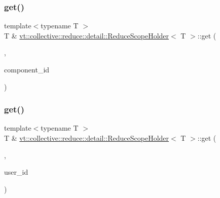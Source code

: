 \subsubsection{\texorpdfstring{get()}{get()}\hspace{0.1cm}{\footnotesize\ttfamily [5/6]}}
{\footnotesize\ttfamily template$<$typename T $>$ \\
T \& \hyperlink{structvt_1_1collective_1_1reduce_1_1detail_1_1_reduce_scope_holder}{vt\+::collective\+::reduce\+::detail\+::\+Reduce\+Scope\+Holder}$<$ T $>$\+::get (\begin{DoxyParamCaption}\item[{\hyperlink{structvt_1_1collective_1_1reduce_1_1detail_1_1_reduce_scope_holder_1_1_component_tag}{Component\+Tag}}]{,  }\item[{\hyperlink{namespacevt_ab6ac935c168b809c422d5121da4f2700}{Component\+I\+D\+Type}}]{component\+\_\+id }\end{DoxyParamCaption})}

\mbox{\label{structvt_1_1collective_1_1reduce_1_1detail_1_1_reduce_scope_holder_a2413b5fd1fbd0b87b09d81240000e5f8}} 
\subsubsection{\texorpdfstring{get()}{get()}\hspace{0.1cm}{\footnotesize\ttfamily [6/6]}}
{\footnotesize\ttfamily template$<$typename T $>$ \\
T \& \hyperlink{structvt_1_1collective_1_1reduce_1_1detail_1_1_reduce_scope_holder}{vt\+::collective\+::reduce\+::detail\+::\+Reduce\+Scope\+Holder}$<$ T $>$\+::get (\begin{DoxyParamCaption}\item[{\hyperlink{structvt_1_1collective_1_1reduce_1_1detail_1_1_reduce_scope_holder_1_1_user_i_d_tag}{User\+I\+D\+Tag}}]{,  }\item[{\hyperlink{namespacevt_1_1collective_1_1reduce_1_1detail_ae82d7b96b0885b9b7dfb0104398beead}{User\+I\+D\+Type}}]{user\+\_\+id }\end{DoxyParamCaption})}

